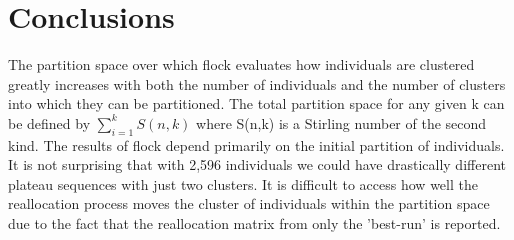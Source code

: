 \section*{Conclusions}
The partition space over which {\sc flock} evaluates how individuals are clustered greatly increases with both the number of individuals and the number of clusters into which they can be partitioned. The total partition space for any given k can be defined by $\sum\limits_{i=1}^k S(n,k)$ where S(n,k) is a Stirling number of the second kind. The results of {\sc flock} depend primarily on the initial partition of individuals. It is not surprising that with 2,596 individuals we could have drastically different plateau sequences with just two clusters. It is difficult to access how well the reallocation process moves the cluster of individuals within the partition space due to the fact that the reallocation matrix from only the 'best-run' is reported. 
